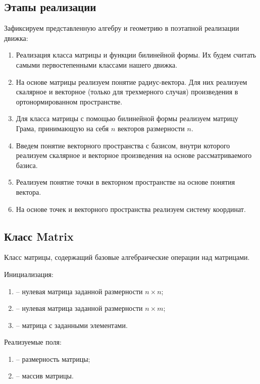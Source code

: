 \subsection{Этапы реализации}

	Зафиксируем представленную алгебру и геометрию в поэтапной реализации движка:
	\begin{enumerate}
		\item Реализация класса матрицы и функции билинейной формы. Их будем считать самыми первостепенными классами нашего движка.
		\item На основе матрицы реализуем понятие радиус-вектора. Для них реализуем скалярное и векторное (только для трехмерного случая) произведения в ортонормированном пространстве.
		\item Для класса матрицы с помощью билинейной формы реализуем матрицу Грама, принимающую на себя $n$ векторов размерности $n$.
		\item Введем понятие векторного пространства с базисом, внутри которого реализуем скалярное и векторное произведения на основе рассматриваемого базиса.
		\item Реализуем понятие точки в векторном пространстве на основе понятия вектора.
		\item На основе точек и векторного пространства реализуем систему координат.
	\end{enumerate}

\subsection{Класс Matrix}
	\noindent Класс матрицы, содержащий базовые алгебраические операции над матрицами.

	\noindent Инициализация:
	\begin{enumerate}
		\item {} -- нулевая матрица заданной размерности \( n \times n \);
		\item {} -- нулевая матрица заданной размерности \( n \times m \);
		\item {} -- матрица с заданными элементами.
	\end{enumerate}

	\noindent Реализуемые поля:
	\begin{enumerate}
		\item {} -- размерность матрицы;
		\item {} -- массив матрицы.
	\end{enumerate}

